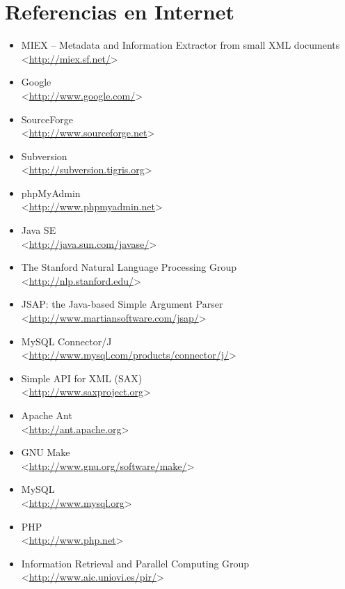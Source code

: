 \chapter{Referencias en Internet}\label{cha:referencias}

\begin{itemize}
 \item MIEX -- Metadata and Information Extractor from small XML documents\\
 <\url{http://miex.sf.net/}>
 \item Google\\
 <\url{http://www.google.com/}>
 \item SourceForge\\
 <\url{http://www.sourceforge.net}>
 \item Subversion\\
 <\url{http://subversion.tigris.org}>
 \item phpMyAdmin\\
 <\url{http://www.phpmyadmin.net}>
 \item Java SE\\
 <\url{http://java.sun.com/javase/}>
 \item The Stanford Natural Language Processing Group\\
 <\url{http://nlp.stanford.edu/}>
 \item JSAP: the Java-based Simple Argument Parser\\
 <\url{http://www.martiansoftware.com/jsap/}>
 \item MySQL Connector/J\\
 <\url{http://www.mysql.com/products/connector/j/}>
 \item Simple API for XML (SAX)\\
 <\url{http://www.saxproject.org}>
 \item Apache Ant\\
 <\url{http://ant.apache.org}>
 \item GNU Make\\
 <\url{http://www.gnu.org/software/make/}>
 \item MySQL\\
 <\url{http://www.mysql.org}>
 \item PHP\\
 <\url{http://www.php.net}>
 \item Information Retrieval and Parallel Computing Group\\
 <\url{http://www.aic.uniovi.es/pir/}>
\end{itemize}
